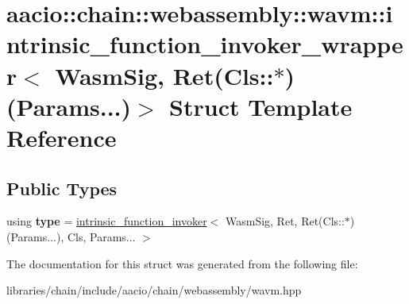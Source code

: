 \hypertarget{structaacio_1_1chain_1_1webassembly_1_1wavm_1_1intrinsic__function__invoker__wrapper_3_01_wasm_s90ebd8cc2e6b3dc30490a6e2f2f86c99}{}\section{aacio\+:\+:chain\+:\+:webassembly\+:\+:wavm\+:\+:intrinsic\+\_\+function\+\_\+invoker\+\_\+wrapper$<$ Wasm\+Sig, Ret(Cls\+:\+:$\ast$)(Params...)$>$ Struct Template Reference}
\label{structaacio_1_1chain_1_1webassembly_1_1wavm_1_1intrinsic__function__invoker__wrapper_3_01_wasm_s90ebd8cc2e6b3dc30490a6e2f2f86c99}
\subsection*{Public Types}
\begin{DoxyCompactItemize}
\item 
\mbox{\label{structaacio_1_1chain_1_1webassembly_1_1wavm_1_1intrinsic__function__invoker__wrapper_3_01_wasm_s90ebd8cc2e6b3dc30490a6e2f2f86c99_a1abc12e4aef7d670627eeb3bb78089b4}} 
using {\bfseries type} = \mbox{\hyperlink{structaacio_1_1chain_1_1webassembly_1_1wavm_1_1intrinsic__function__invoker}{intrinsic\+\_\+function\+\_\+invoker}}$<$ Wasm\+Sig, Ret, Ret(Cls\+::$\ast$)(Params...), Cls, Params... $>$
\end{DoxyCompactItemize}


The documentation for this struct was generated from the following file\+:\begin{DoxyCompactItemize}
\item 
libraries/chain/include/aacio/chain/webassembly/wavm.\+hpp\end{DoxyCompactItemize}

